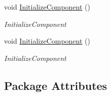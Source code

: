 \begin{DoxyCompactItemize}
void \hyperlink{class_c_p_u___o_s___simulator_1_1_instructions_window_a8ad79899f3d5210d66fb5973b721895a}{Initialize\+Component} ()
\begin{DoxyCompactList}\small\item\em Initialize\+Component \end{DoxyCompactList}\item 
void \hyperlink{class_c_p_u___o_s___simulator_1_1_instructions_window_a8ad79899f3d5210d66fb5973b721895a}{Initialize\+Component} ()
\begin{DoxyCompactList}\small\item\em Initialize\+Component \end{DoxyCompactList}\end{DoxyCompactItemize}
\subsection*{Package Attributes}
